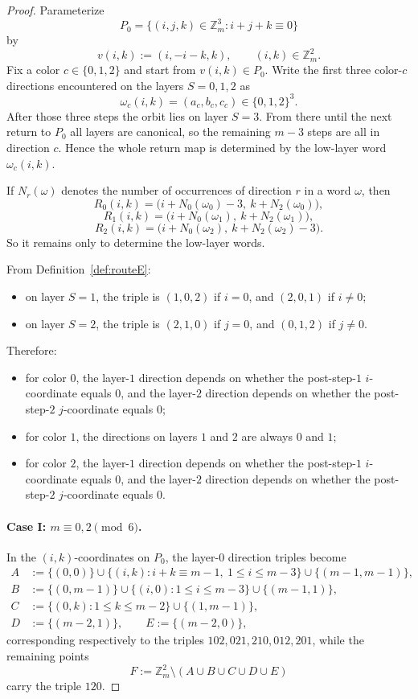 \begin{proof}
Parameterize
\[
P_0=\{(i,j,k)\in \mathbb Z_m^3:i+j+k\equiv 0\}
\]
by
\[
v(i,k):=(i,-i-k,k),\qquad (i,k)\in \mathbb Z_m^2.
\]
Fix a color $c\in\{0,1,2\}$ and start from $v(i,k)\in P_0$.
Write the first three color-$c$ directions encountered on the layers $S=0,1,2$ as
\[
\omega_c(i,k)=(a_c,b_c,c_c)\in\{0,1,2\}^3.
\]
After those three steps the orbit lies on layer $S=3$.
From there until the next return to $P_0$ all layers are canonical, so the remaining $m-3$ steps are all in direction $c$.
Hence the whole return map is determined by the low-layer word $\omega_c(i,k)$.

If $N_r(\omega)$ denotes the number of occurrences of direction $r$ in a word $\omega$, then
\[
R_0(i,k)=\bigl(i+N_0(\omega_0)-3,\ k+N_2(\omega_0)\bigr),
\]
\[
R_1(i,k)=\bigl(i+N_0(\omega_1),\ k+N_2(\omega_1)\bigr),
\]
\[
R_2(i,k)=\bigl(i+N_0(\omega_2),\ k+N_2(\omega_2)-3\bigr).
\]
So it remains only to determine the low-layer words.

From Definition~\ref{def:routeE}:
\begin{itemize}[leftmargin=2em]
\item on layer $S=1$, the triple is $(1,0,2)$ if $i=0$, and $(2,0,1)$ if $i\ne 0$;
\item on layer $S=2$, the triple is $(2,1,0)$ if $j=0$, and $(0,1,2)$ if $j\ne 0$.
\end{itemize}
Therefore:
\begin{itemize}[leftmargin=2em]
\item for color $0$, the layer-$1$ direction depends on whether the post-step-$1$ $i$-coordinate equals $0$, and the layer-$2$ direction depends on whether the post-step-$2$ $j$-coordinate equals $0$;
\item for color $1$, the directions on layers $1$ and $2$ are always $0$ and $1$;
\item for color $2$, the layer-$1$ direction depends on whether the post-step-$1$ $i$-coordinate equals $0$, and the layer-$2$ direction depends on whether the post-step-$2$ $j$-coordinate equals $0$.
\end{itemize}

\paragraph{Case I: $m\equiv 0,2\pmod 6$.}
In the $(i,k)$-coordinates on $P_0$, the layer-$0$ direction triples become
\begin{align*}
A&:=\{(0,0)\}\cup\{(i,k):i+k\equiv m-1,\ 1\le i\le m-3\}\cup\{(m-1,m-1)\},\\
B&:=\{(0,m-1)\}\cup\{(i,0):1\le i\le m-3\}\cup\{(m-1,1)\},\\
C&:=\{(0,k):1\le k\le m-2\}\cup\{(1,m-1)\},\\
D&:=\{(m-2,1)\},\qquad E:=\{(m-2,0)\},
\end{align*}
corresponding respectively to the triples $102,021,210,012,201$, while the remaining points
\[
F:=\mathbb Z_m^2\setminus (A\cup B\cup C\cup D\cup E)
\]
carry the triple $120$.


\end{proof}

